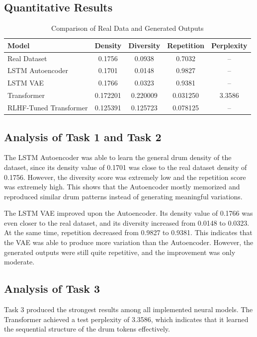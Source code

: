 \documentclass[conference]{IEEEtran}
\begin{document}
\subsection{Quantitative Results}
\begin{table}[h]
\centering
\caption{Comparison of Real Data and Generated Outputs}
\begin{tabular}{lcccc}
\hline
\textbf{Model} & \textbf{Density} & \textbf{Diversity} & \textbf{Repetition} & \textbf{Perplexity} \\
\hline
Real Dataset            & 0.1756   & 0.0938   & 0.7032   & -- \\
LSTM Autoencoder        & 0.1701   & 0.0148   & 0.9827   & -- \\
LSTM VAE                & 0.1766   & 0.0323   & 0.9381   & -- \\
Transformer             & 0.172201 & 0.220009 & 0.031250 & 3.3586 \\
RLHF-Tuned Transformer  & 0.125391 & 0.125723 & 0.078125 & -- \\
\hline
\end{tabular}
\end{table}

\subsection{Analysis of Task 1 and Task 2}
The LSTM Autoencoder was able to learn the general drum density of the dataset, since its density value of 0.1701 was close to the real dataset density of 0.1756. However, the diversity score was extremely low and the repetition score was extremely high. This shows that the Autoencoder mostly memorized and reproduced similar drum patterns instead of generating meaningful variations.

The LSTM VAE improved upon the Autoencoder. Its density value of 0.1766 was even closer to the real dataset, and its diversity increased from 0.0148 to 0.0323. At the same time, repetition decreased from 0.9827 to 0.9381. This indicates that the VAE was able to produce more variation than the Autoencoder. However, the generated outputs were still quite repetitive, and the improvement was only moderate.

\subsection{Analysis of Task 3}
Task 3 produced the strongest results among all implemented neural models. The Transformer achieved a test perplexity of 3.3586, which indicates that it learned the sequential structure of the drum tokens effectively.
\end{document}
